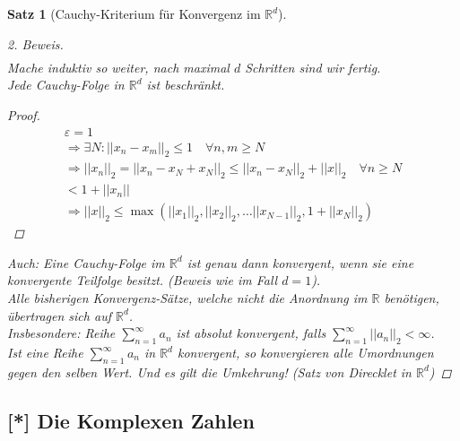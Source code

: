 \documentclass[11pt, twoside, a4paper]{article}
\theoremstyle{plain}
\newtheorem{satz}[blockelement]{Satz}
\newcommand{\pair}[1]{\left(#1\right)}
\newcommand{\abs}[1]{\left|#1\right|}
\newcommand{\norm}[1]{\abs{\abs{#1}}}
\newcommand{\impl}[0]{\Rightarrow{}}
\newcommand{\realnumbers}{\mathbb{R}}
\begin{document}
\begin{satz}[Cauchy-Kriterium für Konvergenz im $\realnumbers^d$]
\begin{proof}[2. Beweis]
\begin{align*}
            \end{align*}
            Mache induktiv so weiter, nach maximal $d$ Schritten sind wir fertig.\\
            Jede Cauchy-Folge in $\realnumbers^d$ ist beschränkt.
            \begin{proof}
                \begin{align*}
                    \varepsilon = 1\\
                    \impl \exists N\colon\norm{x_n-x_m}_2 \leq 1\quad\forall n,m\geq N\\
                    \impl \norm{x_n}_2 = \norm{x_n-x_N+x_N}_2 \leq \norm{x_n-x_N}_2 + \norm{x}_2\quad\forall n\geq N\\
                    < 1 + \norm{x_n}\\
                    \impl \norm{x}_2 \leq \max\pair{\norm{x_1}_2, \norm{x_2}_2,\dots\norm{x_{N-1}}_2, 1+\norm{x_N}_2}
                \end{align*}
            \end{proof}
            Auch: Eine Cauchy-Folge im $\realnumbers^d$ ist genau dann konvergent, wenn sie eine konvergente Teilfolge besitzt. (Beweis wie im Fall $d=1$).\\
            Alle bisherigen Konvergenz-Sätze, welche nicht die Anordnung im $\realnumbers$ benötigen, übertragen sich auf $\realnumbers^d$.\\
            Insbesondere: Reihe $\sum_{n=1}^{\infty} a_n$ ist absolut konvergent, falls $\sum_{n=1}^{\infty} \norm{a_n}_2 < \infty$.\\
            Ist eine Reihe $\sum_{n=1}^{\infty} a_n$ in $\realnumbers^d$ konvergent, so konvergieren alle Umordnungen gegen den selben Wert. Und es gilt die Umkehrung! (Satz von Direcklet in $\realnumbers^d$)
        \end{proof}
    \end{satz}

    \subsection{[*] Die Komplexen Zahlen}
\end{document}
